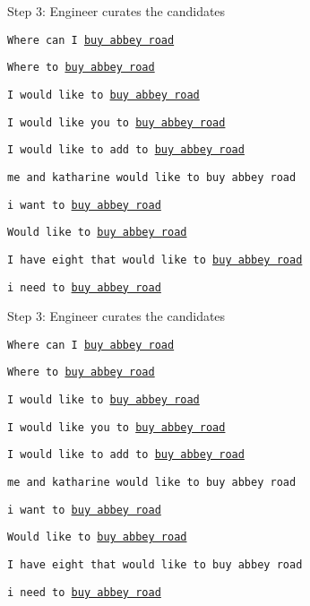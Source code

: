 \documentclass[12pt]{beamer}
\begin{document}
\begin{frame}{Step 3: Engineer curates the candidates}

  \texttt{Where can I \underline{buy abbey road}}

  \texttt{Where to \underline{buy abbey road}}

  \texttt{I would like to \underline{buy abbey road}}

  \bigskip 

  \texttt{I would like you to \underline{buy abbey road}}

  \texttt{I would like to add to \underline{buy abbey road}}

  \texttt{me and katharine would like to buy abbey road}

  \texttt{i want to \underline{buy abbey road}}

  \texttt{Would like to \underline{buy abbey road}}

  \texttt{I have eight that would like to \underline{buy abbey road}}

  \texttt{i need to \underline{buy abbey road}}

\end{frame}

\begin{frame}{Step 3: Engineer curates the candidates}

  \texttt{Where can I \underline{buy abbey road}}

  \texttt{Where to \underline{buy abbey road}}

  \texttt{I would like to \underline{buy abbey road}}

  \bigskip 

  \texttt{I would like you to \underline{buy abbey road}}

  \texttt{I would like to add to \underline{buy abbey road}}

  \texttt{me and katharine would like to buy abbey road}

  \texttt{i want to \underline{buy abbey road}}

  \texttt{Would like to \underline{buy abbey road}}

  {\color{red}\texttt{I have eight that would like to buy abbey road}}

    \texttt{i need to \underline{buy abbey road}}

  \end{frame}
\end{document}
